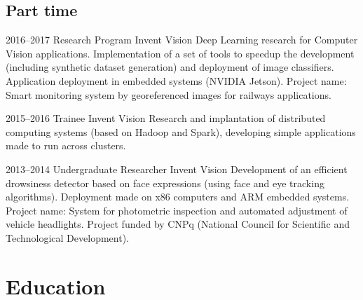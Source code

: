 \documentclass[a4paper]{cv-friggeri-x}
\begin{document}

\subsection{Part time}

\begin{entrylist}

\entry
    {2016--2017}
    {Research Program}%
    {Invent Vision}
    {Deep Learning research for Computer Vision applications. Implementation of a set of tools to speedup the development (including synthetic dataset generation) and deployment of image classifiers. Application deployment in embedded systems (NVIDIA Jetson). Project name: Smart monitoring system by georeferenced images for railways applications.}

\entry
    {2015--2016}
    {Trainee}
    {Invent Vision}
    {Research and implantation of distributed computing systems (based on Hadoop and Spark), developing simple applications made to run across clusters.}

\entry
    {2013--2014}
    {Undergraduate Researcher}
    {Invent Vision}
    {Development of an efficient drowsiness detector based on face expressions (using face and eye tracking algorithms). Deployment made on x86 computers and ARM embedded systems. Project name: System for photometric inspection and automated adjustment of vehicle headlights. Project funded by CNPq (National Council for Scientific and Technological Development).}



\end{entrylist}


\section{Education}
\end{document}
